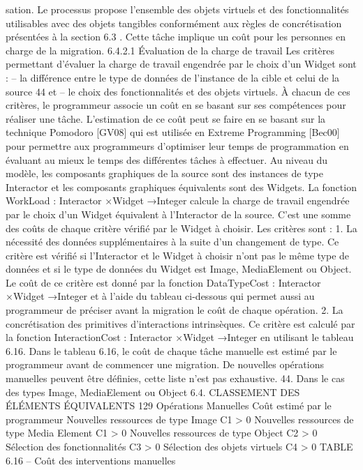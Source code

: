 \documentclass{article}
\begin{document}
sation. Le processus propose l’ensemble des objets virtuels et des fonctionnalités utilisables avec des
objets tangibles conformément aux règles de concrétisation présentées à la section 6.3 . Cette tâche
implique un coût pour les personnes en charge de la migration.
6.4.2.1
Évaluation de la charge de travail
Les critères permettant d’évaluer la charge de travail engendrée par le choix d’un Widget sont :
– la différence entre le type de données de l’instance de la cible et celui de la source 44 et
– le choix des fonctionnalités et des objets virtuels.
À chacun de ces critères, le programmeur associe un coût en se basant sur ses compétences pour
réaliser une tâche. L’estimation de ce coût peut se faire en se basant sur la technique Pomodoro [GV08]
qui est utilisée en Extreme Programming [Bec00] pour permettre aux programmeurs d’optimiser leur
temps de programmation en évaluant au mieux le temps des différentes tâches à effectuer.
Au niveau du modèle, les composants graphiques de la source sont des instances de type Interactor
et les composants graphiques équivalents sont des Widgets. La fonction
WorkLoad : Interactor ×Widget →{Integer}
calcule la charge de travail engendrée par le choix d’un Widget équivalent à l’Interactor de la source.
C’est une somme des coûts de chaque critère vériﬁé par le Widget à choisir. Les critères sont :
1. La nécessité des données supplémentaires à la suite d’un changement de type. Ce critère est
vériﬁé si l’Interactor et le Widget à choisir n’ont pas le même type de données et si le type de
données du Widget est Image, MediaElement ou Object. Le coût de ce critère est donné par la
fonction
DataTypeCost : Interactor ×Widget →Integer
et à l’aide du tableau ci-dessous qui permet aussi au programmeur de préciser avant la migration
le coût de chaque opération.
2. La concrétisation des primitives d’interactions intrinsèques. Ce critère est calculé par la fonction
InteractionCost : Interactor ×Widget →Integer
en utilisant le tableau 6.16.
Dans le tableau 6.16, le coût de chaque tâche manuelle est estimé par le programmeur avant de
commencer une migration. De nouvelles opérations manuelles peuvent être déﬁnies, cette liste n’est
pas exhaustive.
44. Dans le cas des types Image, MediaElement ou Object
6.4. CLASSEMENT DES ÉLÉMENTS ÉQUIVALENTS
129
Opérations Manuelles
Coût estimé par le
programmeur
Nouvelles ressources de type
Image
C1 > 0
Nouvelles ressources de type
Media Element
C1 > 0
Nouvelles ressources de type
Object
C2 > 0
Sélection des fonctionnalités
C3 > 0
Sélection des objets virtuels
C4 > 0
TABLE 6.16 – Coût des interventions manuelles
\end{document}
